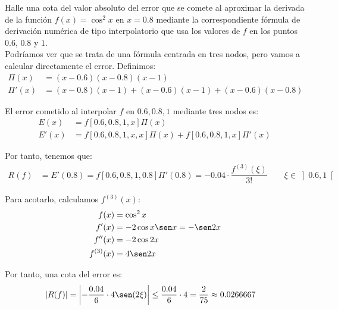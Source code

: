 \begin{ejercicio}\label{ej:2.1.8}
    Halle una cota del valor absoluto del error que se comete al aproximar la derivada de la función $f(x) = \cos^2 x$ en $x = 0.8$ mediante la correspondiente fórmula de derivación numérica de tipo interpolatorio que usa los valores de $f$ en los puntos $0.6$, $0.8$ y $1$.\\

    Podríamos ver que se trata de una fórmula centrada en tres nodos, pero vamos a calcular directamente el error. Definimos:
    \begin{align*}
        \Pi(x) &= (x-0.6)(x-0.8)(x-1)\\
        \Pi'(x) &= (x-0.8)(x-1) + (x-0.6)(x-1) + (x-0.6)(x-0.8)
    \end{align*}

    El error cometido al interpolar $f$ en $0.6, 0.8, 1$ mediante tres nodos es:
    \begin{align*}
        E(x) &= f[0.6, 0.8, 1, x]\Pi(x)\\
        E'(x) &= f[0.6, 0.8, 1, x, x]\Pi(x) + f[0.6, 0.8, 1, x]\Pi'(x)
    \end{align*}

    Por tanto, tenemos que:
    \begin{align*}
        R(f) &= E'(0.8) = f[0.6, 0.8, 1, 0.8]\Pi'(0.8) = -0.04\cdot \dfrac{f^{(3)}(\xi)}{3!} \qquad \xi\in\left]0.6, 1\right[
    \end{align*}

    Para acotarlo, calculamos $f^{(3)}(x)$:
    \begin{align*}
        f(x) &= \cos^2 x\\
        f'(x) &= -2\cos x\sen x = -\sen 2x\\
        f''(x) &= -2\cos 2x\\
        f^{(3)}(x) &= 4\sen 2x
    \end{align*}

    Por tanto, una cota del error es:
    \begin{align*}
        \left|R(f)\right| &= \left|-\dfrac{0.04}{6}\cdot 4\sen(2\xi)\right|\leq \dfrac{0.04}{6}\cdot 4 = \dfrac{2}{75} \approx 0.0266667
    \end{align*}

\end{ejercicio}